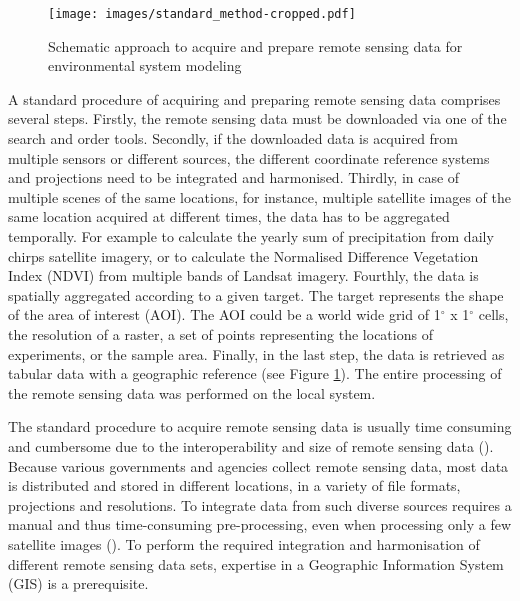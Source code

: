\begin{center}
	\begin{figure}[h]
		\begin{center}
			\texttt{[image: images/standard\_method-cropped.pdf]}
			\caption{Schematic approach to acquire and prepare remote sensing data for environmental system modeling}
			\label{traditionl_approach}
		\end{center}
	\end{figure}
\end{center}


A standard procedure of acquiring and preparing remote sensing data comprises several steps. Firstly, the remote sensing data must be downloaded via one of the search and order tools. Secondly, if the downloaded data is acquired from multiple sensors or different sources, the different coordinate reference systems and projections need to be integrated and harmonised. Thirdly, in case of multiple scenes of the same locations, for instance, multiple satellite images of the same location acquired at different times, the data has to be aggregated temporally. For example to calculate the yearly sum of precipitation from daily chirps satellite imagery, or to calculate the Normalised Difference Vegetation Index (NDVI) from multiple bands of Landsat imagery.
Fourthly, the data is spatially aggregated according to a given target. The target represents the shape of the area of interest (AOI). The AOI could be a world wide grid of 1$^\circ$ x 1$^\circ$ cells, the resolution of a raster, a set of points representing the locations of experiments, or the sample area. Finally, in the last step, the data is retrieved as tabular data with a geographic reference (see Figure \ref{traditionl_approach}). The entire processing of the remote sensing data was performed on the local system.

The standard procedure to acquire remote sensing data is usually time consuming and cumbersome due to the interoperability and size of remote sensing data (\cite{iosifescu2011geovite}).
Because various governments and agencies collect remote sensing data, most data is distributed and stored in different locations, in a variety of file formats, projections and resolutions. To integrate data from such diverse sources requires a manual and thus time-consuming pre-processing, even when processing only a few satellite images (\cite{schell2000geodata}). To perform the required integration and harmonisation of different remote sensing data sets, expertise in a Geographic Information System (GIS) is a prerequisite.

